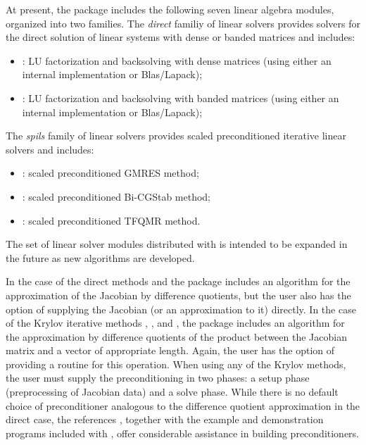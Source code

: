 At present, the package includes the following seven {\ida} linear algebra
modules, organized into two families. The {\em direct} familiy of linear
solvers provides solvers for the direct solution of linear systems with
dense or banded matrices and includes:
\begin{itemize} 
\item {\idadense}: LU factorization and backsolving with dense matrices
  (using either an internal implementation or Blas/Lapack); 
\item {\idaband}: LU factorization and backsolving with banded matrices
  (using either an internal implementation or Blas/Lapack); 
\end{itemize}
The {\em spils} family of linear solvers provides scaled preconditioned
iterative linear solvers and includes:
\begin{itemize} 
\item {\idaspgmr}: scaled preconditioned GMRES method;
\item {\idaspbcg}: scaled preconditioned Bi-CGStab method;
\item {\idasptfqmr}: scaled preconditioned TFQMR method.
\end{itemize}
The set of linear solver modules distributed with {\ida} is intended to be expanded in the
future as new algorithms are developed.

In the case of the direct methods {\idadense} and {\idaband}
the package includes an algorithm for the approximation of the Jacobian by difference
quotients, but the user also has the option of supplying the Jacobian
(or an approximation to it) directly. In the case of the Krylov iterative methods
{\idaspgmr}, {\idaspbcg}, and {\idasptfqmr}, the package includes an algorithm for
the approximation by difference quotients of the product between the Jacobian matrix
and a vector of appropriate length. Again, the user has the option of providing
a routine for this operation.
When  using any of the Krylov
methods, the user must supply the preconditioning in two phases: 
a setup phase (preprocessing of Jacobian data) and a solve phase.
While there is no default
choice of preconditioner analogous to the difference quotient
approximation in the direct case, the references
\cite{BrHi:89, Byr:92}, together with
the example and demonstration programs included with {\ida}, offer
considerable assistance in building preconditioners.

